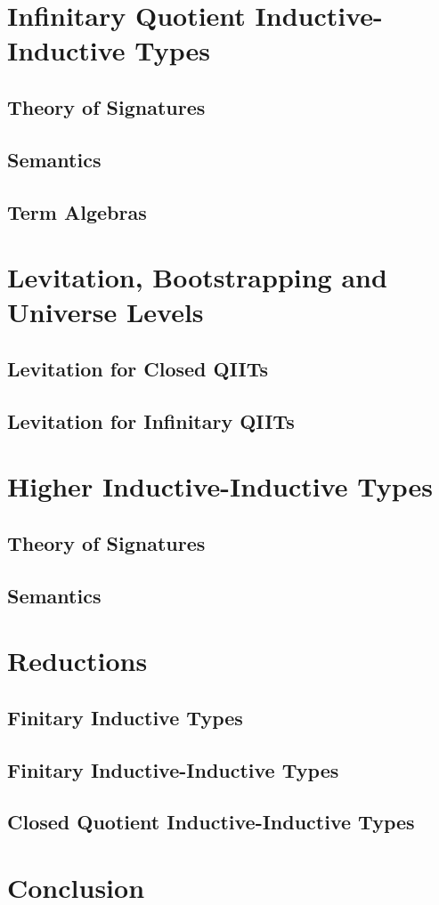 \documentclass[12pt,a4paper,twoside,openany]{book}
\theoremstyle{remark}
\theoremstyle{definition}
\begin{document}
\chapter{Infinitary Quotient Inductive-Inductive Types}
\label{chap:iqiit}
\section{Theory of Signatures}
\section{Semantics}
\section{Term Algebras}

\chapter{Levitation, Bootstrapping and Universe Levels}
\label{chap:levitation}
\section{Levitation for Closed QIITs}
\section{Levitation for Infinitary QIITs}

\chapter{Higher Inductive-Inductive Types}
\label{chap:hiit}

\section{Theory of Signatures}
\section{Semantics}

\chapter{Reductions}

\section{Finitary Inductive Types}
\section{Finitary Inductive-Inductive Types}
\section{Closed Quotient Inductive-Inductive Types}

\chapter{Conclusion}


\backmatter
\end{document}
